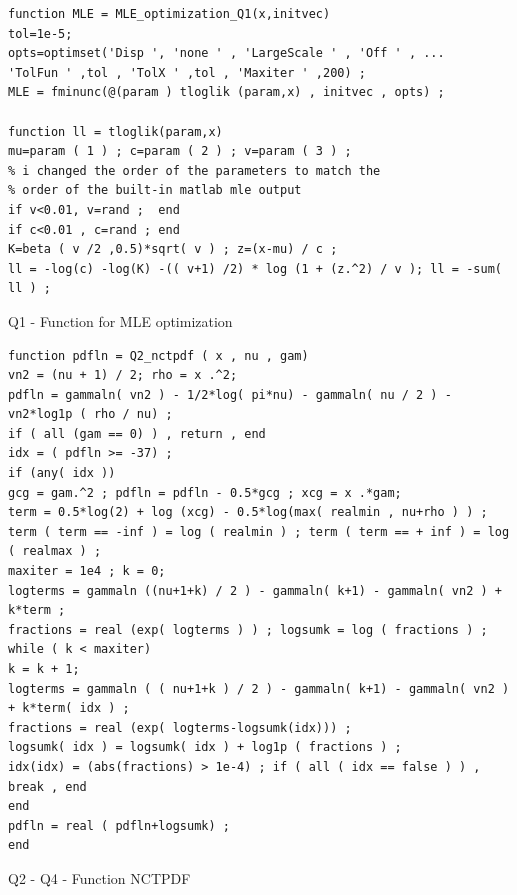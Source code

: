 \documentclass[12pt]{article}
\begin{document}
\begin{Program}[!htb]
\begin{lstlisting}[style=Matlab-editor,basicstyle=\mlttfamily\footnotesize]
%Q1 - Function for MLE optimization ---------------------------------------
function MLE = MLE_optimization_Q1(x,initvec)
tol=1e-5;
opts=optimset('Disp ', 'none ' , 'LargeScale ' , 'Off ' , ...
'TolFun ' ,tol , 'TolX ' ,tol , 'Maxiter ' ,200) ;
MLE = fminunc(@(param ) tloglik (param,x) , initvec , opts) ;

function ll = tloglik(param,x)
mu=param ( 1 ) ; c=param ( 2 ) ; v=param ( 3 ) ; 
% i changed the order of the parameters to match the 
% order of the built-in matlab mle output
if v<0.01, v=rand ;  end 
if c<0.01 , c=rand ; end 
K=beta ( v /2 ,0.5)*sqrt( v ) ; z=(x-mu) / c ;
ll = -log(c) -log(K) -(( v+1) /2) * log (1 + (z.^2) / v ); ll = -sum( ll ) ;
\end{lstlisting}
\caption{Q1 - Function for MLE optimization}
\label{Q1 - Function for MLE optimization}
\end{Program}


\begin{Program}[!htb]
\begin{lstlisting}[style=Matlab-editor,basicstyle=\mlttfamily\footnotesize]
%Q2 & Q4 - Function: NCTPDF ------------------------------------------
function pdfln = Q2_nctpdf ( x , nu , gam)
vn2 = (nu + 1) / 2; rho = x .^2;
pdfln = gammaln( vn2 ) - 1/2*log( pi*nu) - gammaln( nu / 2 ) - vn2*log1p ( rho / nu) ;
if ( all (gam == 0) ) , return , end
idx = ( pdfln >= -37) ; 
if (any( idx ))
gcg = gam.^2 ; pdfln = pdfln - 0.5*gcg ; xcg = x .*gam;
term = 0.5*log(2) + log (xcg) - 0.5*log(max( realmin , nu+rho ) ) ;
term ( term == -inf ) = log ( realmin ) ; term ( term == + inf ) = log ( realmax ) ;
maxiter = 1e4 ; k = 0;
logterms = gammaln ((nu+1+k) / 2 ) - gammaln( k+1) - gammaln( vn2 ) + k*term ;
fractions = real (exp( logterms ) ) ; logsumk = log ( fractions ) ;
while ( k < maxiter)
k = k + 1;
logterms = gammaln ( ( nu+1+k ) / 2 ) - gammaln( k+1) - gammaln( vn2 ) + k*term( idx ) ;
fractions = real (exp( logterms-logsumk(idx))) ;
logsumk( idx ) = logsumk( idx ) + log1p ( fractions ) ;
idx(idx) = (abs(fractions) > 1e-4) ; if ( all ( idx == false ) ) , break , end
end
pdfln = real ( pdfln+logsumk) ;
end
\end{lstlisting}
\caption{Q2 - Q4 - Function NCTPDF}
\label{Q2 & Q4 - Function NCTPDF}
\end{Program}
\end{document}
